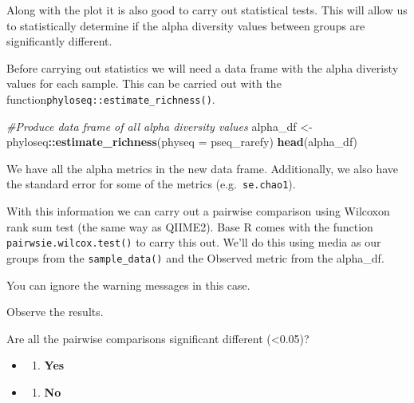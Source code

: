 \documentclass[
]{book}
\newenvironment{Shaded}{\begin{snugshade}}{\end{snugshade}}
\newcommand{\AttributeTok}[1]{\textcolor[rgb]{0.13,0.29,0.53}{#1}}
\newcommand{\CommentTok}[1]{\textcolor[rgb]{0.56,0.35,0.01}{\textit{#1}}}
\newcommand{\FunctionTok}[1]{\textcolor[rgb]{0.13,0.29,0.53}{\textbf{#1}}}
\newcommand{\NormalTok}[1]{#1}
\newcommand{\OtherTok}[1]{\textcolor[rgb]{0.56,0.35,0.01}{#1}}
\newcommand{\SpecialCharTok}[1]{\textcolor[rgb]{0.81,0.36,0.00}{\textbf{#1}}}
\providecommand{\tightlist}{%
  \setlength{\itemsep}{0pt}\setlength{\parskip}{0pt}}
\begin{document}
Along with the plot it is also good to carry out statistical tests.
This will allow us to statistically determine if the alpha diversity values between groups are significantly different.

Before carrying out statistics we will need a data frame with the alpha diveristy values for each sample.
This can be carried out with the function\texttt{phyloseq::estimate\_richness()}.

\begin{Shaded}
\begin{Highlighting}[]
\CommentTok{\#Produce data frame of all alpha diversity values}
\NormalTok{alpha\_df }\OtherTok{\textless{}{-}}\NormalTok{ phyloseq}\SpecialCharTok{::}\FunctionTok{estimate\_richness}\NormalTok{(}\AttributeTok{physeq =}\NormalTok{ pseq\_rarefy)}
\FunctionTok{head}\NormalTok{(alpha\_df)}
\end{Highlighting}
\end{Shaded}

We have all the alpha metrics in the new data frame.
Additionally, we also have the standard error for some of the metrics (e.g.~\texttt{se.chao1}).

With this information we can carry out a pairwise comparison using Wilcoxon rank sum test (the same way as QIIME2).
Base R comes with the function \texttt{pairwsie.wilcox.test()} to carry this out.
We'll do this using media as our groups from the \texttt{sample\_data()} and the Observed metric from the alpha\_df.

\begin{Shaded}
\end{Shaded}

You can ignore the warning messages in this case.

Observe the results.

Are all the pairwise comparisons significant different (\textless0.05)?

\begin{itemize}
\item
  \begin{enumerate}
  \def\labelenumi{(\Alph{enumi})}
  \tightlist
  \item
    \textbf{Yes}\\
  \end{enumerate}
\item
  \begin{enumerate}
  \def\labelenumi{(\Alph{enumi})}
  \setcounter{enumi}{1}
  \tightlist
  \item
    \textbf{No}
  \end{enumerate}
\end{itemize}
\end{document}
